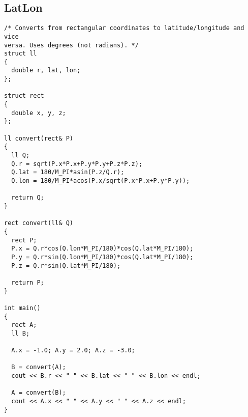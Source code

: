 \subsection{LatLon}
\begin{lstlisting}
/* Converts from rectangular coordinates to latitude/longitude and vice
versa. Uses degrees (not radians). */
struct ll
{
  double r, lat, lon;
};

struct rect
{
  double x, y, z;
};

ll convert(rect& P)
{
  ll Q;
  Q.r = sqrt(P.x*P.x+P.y*P.y+P.z*P.z);
  Q.lat = 180/M_PI*asin(P.z/Q.r);
  Q.lon = 180/M_PI*acos(P.x/sqrt(P.x*P.x+P.y*P.y));
  
  return Q;
}

rect convert(ll& Q)
{
  rect P;
  P.x = Q.r*cos(Q.lon*M_PI/180)*cos(Q.lat*M_PI/180);
  P.y = Q.r*sin(Q.lon*M_PI/180)*cos(Q.lat*M_PI/180);
  P.z = Q.r*sin(Q.lat*M_PI/180);
  
  return P;
}

int main()
{
  rect A;
  ll B;
  
  A.x = -1.0; A.y = 2.0; A.z = -3.0;
  
  B = convert(A);
  cout << B.r << " " << B.lat << " " << B.lon << endl;
  
  A = convert(B);
  cout << A.x << " " << A.y << " " << A.z << endl;
}
\end{lstlisting}